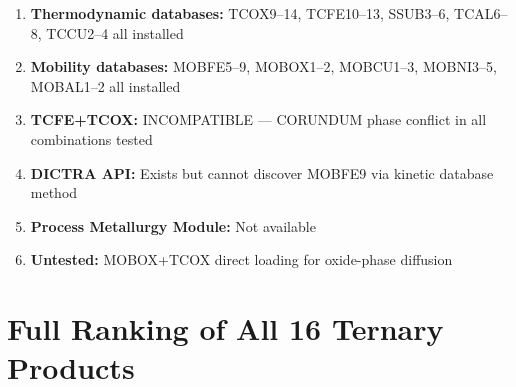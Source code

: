 \documentclass[11pt]{article}
\begin{document}
\begin{enumerate}[leftmargin=*]
    \item \textbf{Thermodynamic databases:} TCOX9--14, TCFE10--13, SSUB3--6, TCAL6--8, TCCU2--4 all installed
    \item \textbf{Mobility databases:} MOBFE5--9, MOBOX1--2, MOBCU1--3, MOBNI3--5, MOBAL1--2 all installed
    \item \textbf{TCFE+TCOX:} INCOMPATIBLE --- CORUNDUM phase conflict in all combinations tested
    \item \textbf{DICTRA API:} Exists but cannot discover MOBFE9 via kinetic database method
    \item \textbf{Process Metallurgy Module:} Not available
    \item \textbf{Untested:} MOBOX+TCOX direct loading for oxide-phase diffusion
\end{enumerate}

\newpage
\appendix
\section{Full Ranking of All 16 Ternary Products}
\end{document}
